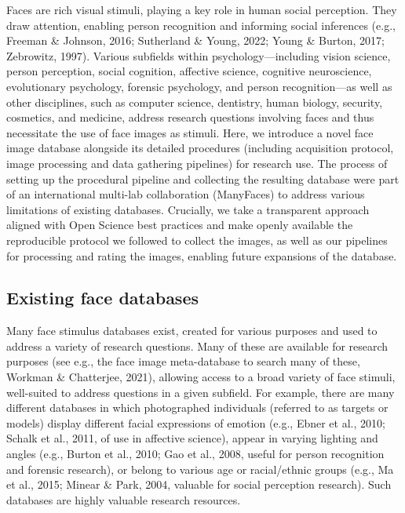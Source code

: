 \documentclass[
  letterpaper,
  DIV=11,
  numbers=noendperiod]{scrartcl}
\begin{document}
Faces are rich visual stimuli, playing a key role in human social
perception. They draw attention, enabling person recognition and
informing social inferences (e.g., Freeman \& Johnson, 2016; Sutherland
\& Young, 2022; Young \& Burton, 2017; Zebrowitz, 1997). Various
subfields within psychology---including vision science, person
perception, social cognition, affective science, cognitive neuroscience,
evolutionary psychology, forensic psychology, and person
recognition---as well as other disciplines, such as computer science,
dentistry, human biology, security, cosmetics, and medicine, address
research questions involving faces and thus necessitate the use of face
images as stimuli. Here, we introduce a novel face image database
alongside its detailed procedures (including acquisition protocol, image
processing and data gathering pipelines) for research use. The process
of setting up the procedural pipeline and collecting the resulting
database were part of an international multi-lab collaboration
(ManyFaces) to address various limitations of existing databases.
Crucially, we take a transparent approach aligned with Open Science best
practices and make openly available the reproducible protocol we
followed to collect the images, as well as our pipelines for processing
and rating the images, enabling future expansions of the database.

\subsection{Existing face databases}\label{existing-face-databases}

Many face stimulus databases exist, created for various purposes and
used to address a variety of research questions. Many of these are
available for research purposes (see e.g., the face image meta-database
to search many of these, Workman \& Chatterjee, 2021), allowing access
to a broad variety of face stimuli, well-suited to address questions in
a given subfield. For example, there are many different databases in
which photographed individuals (referred to as targets or models)
display different facial expressions of emotion (e.g., Ebner et al.,
2010; Schalk et al., 2011, of use in affective science), appear in
varying lighting and angles (e.g., Burton et al., 2010; Gao et al.,
2008, useful for person recognition and forensic research), or belong to
various age or racial/ethnic groups (e.g., Ma et al., 2015; Minear \&
Park, 2004, valuable for social perception research). Such databases are
highly valuable research resources.
\end{document}
